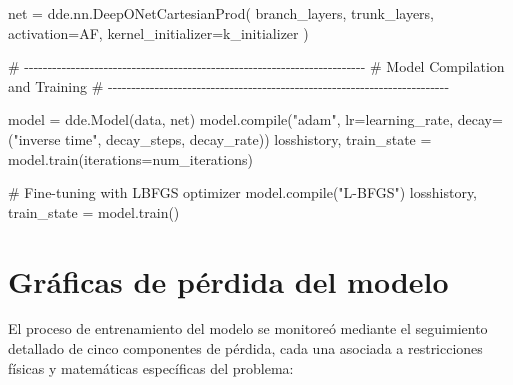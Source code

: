 \documentclass[
  spanish,
  us-letterpaper,
  DIV=11,
  numbers=noendperiod]{scrreprt}
\newenvironment{Shaded}{\begin{snugshade}}{\end{snugshade}}
\newcommand{\BuiltInTok}[1]{\textcolor[rgb]{0.00,0.23,0.31}{#1}}
\newcommand{\CommentTok}[1]{\textcolor[rgb]{0.37,0.37,0.37}{#1}}
\newcommand{\NormalTok}[1]{\textcolor[rgb]{0.00,0.23,0.31}{#1}}
\newcommand{\OperatorTok}[1]{\textcolor[rgb]{0.37,0.37,0.37}{#1}}
\newcommand{\StringTok}[1]{\textcolor[rgb]{0.13,0.47,0.30}{#1}}
\theoremstyle{plain}
\theoremstyle{definition}
\theoremstyle{remark}
\begin{document}
\begin{Shaded}
\begin{Highlighting}[]
\NormalTok{net }\OperatorTok{=}\NormalTok{ dde.nn.DeepONetCartesianProd(}
\NormalTok{    branch\_layers,}
\NormalTok{    trunk\_layers,}
\NormalTok{    activation}\OperatorTok{=}\NormalTok{AF,}
\NormalTok{    kernel\_initializer}\OperatorTok{=}\NormalTok{k\_initializer}
\NormalTok{)}

\CommentTok{\# {-}{-}{-}{-}{-}{-}{-}{-}{-}{-}{-}{-}{-}{-}{-}{-}{-}{-}{-}{-}{-}{-}{-}{-}{-}{-}{-}{-}{-}{-}{-}{-}{-}{-}{-}{-}{-}{-}{-}{-}{-}{-}{-}{-}{-}{-}{-}{-}{-}{-}{-}{-}{-}{-}{-}{-}{-}{-}{-}{-}{-}{-}{-}{-}{-}{-}{-}{-}{-}{-}{-}{-}{-}}
\CommentTok{\# Model Compilation and Training}
\CommentTok{\# {-}{-}{-}{-}{-}{-}{-}{-}{-}{-}{-}{-}{-}{-}{-}{-}{-}{-}{-}{-}{-}{-}{-}{-}{-}{-}{-}{-}{-}{-}{-}{-}{-}{-}{-}{-}{-}{-}{-}{-}{-}{-}{-}{-}{-}{-}{-}{-}{-}{-}{-}{-}{-}{-}{-}{-}{-}{-}{-}{-}{-}{-}{-}{-}{-}{-}{-}{-}{-}{-}{-}{-}{-}}

\NormalTok{model }\OperatorTok{=}\NormalTok{ dde.Model(data, net)}
\NormalTok{model.}\BuiltInTok{compile}\NormalTok{(}\StringTok{"adam"}\NormalTok{, lr}\OperatorTok{=}\NormalTok{learning\_rate,}
\NormalTok{            decay}\OperatorTok{=}\NormalTok{(}\StringTok{"inverse time"}\NormalTok{, decay\_steps, decay\_rate))}
\NormalTok{losshistory, train\_state }\OperatorTok{=}\NormalTok{ model.train(iterations}\OperatorTok{=}\NormalTok{num\_iterations)}

\CommentTok{\# Fine{-}tuning with LBFGS optimizer}
\NormalTok{model.}\BuiltInTok{compile}\NormalTok{(}\StringTok{"L{-}BFGS"}\NormalTok{)}
\NormalTok{losshistory, train\_state }\OperatorTok{=}\NormalTok{ model.train()}
\end{Highlighting}
\end{Shaded}

\section{Gráficas de pérdida del
modelo}\label{gruxe1ficas-de-puxe9rdida-del-modelo}

El proceso de entrenamiento del modelo se monitoreó mediante el
seguimiento detallado de cinco componentes de pérdida, cada una asociada
a restricciones físicas y matemáticas específicas del problema:
\end{document}
